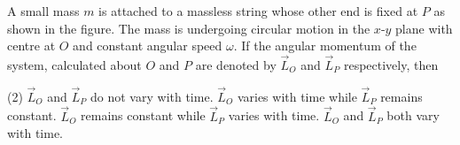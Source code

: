
\item A small mass $m$ is attached to a massless string whose other end is fixed at $P$ as shown in the figure. The mass is undergoing circular motion in the $x$-$y$ plane with centre at $O$ and constant angular speed $\omega$. If the angular momentum of the system, calculated about $O$ and $P$ are denoted by $\vec{L}_O$ and $\vec{L}_P$ respectively, then
    \begin{center}
    \end{center}
    \begin{tasks}(2)
        \task $\vec{L}_O$ and $\vec{L}_P$ do not vary with time.
        \task $\vec{L}_O$ varies with time while $\vec{L}_P$ remains constant.
        \task $\vec{L}_O$ remains constant while $\vec{L}_P$ varies with time.
        \task $\vec{L}_O$ and $\vec{L}_P$ both vary with time.
    \end{tasks}
